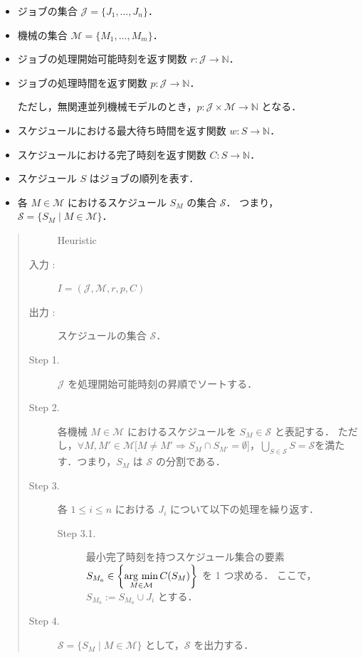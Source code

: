 \documentclass[12pt]{optlab-bachelor}
\newcommand{\argmin}{\mathop{\rm arg~min}\limits}
\begin{document}
\begin{itemize}
  \item ジョブの集合 $\mathcal{J} = \{J_1,\ldots,J_n\}$．
  \item 機械の集合 $\mathcal{M} = \{M_1,\ldots,M_m\}$．
  \item ジョブの処理開始可能時刻を返す関数 $r : \mathcal{J} \to \mathbb{N}$．
  \item ジョブの処理時間を返す関数 $p : \mathcal{J} \to \mathbb{N}$．

  ただし，無関連並列機械モデルのとき，$p : \mathcal{J} \times \mathcal{M} \to \mathbb{N}$ となる．
  \item スケジュールにおける最大待ち時間を返す関数 $w : S \to \mathbb{N}$．
  \item スケジュールにおける完了時刻を返す関数 $C : S \to \mathbb{N}$．
  \item スケジュール $S$ はジョブの順列を表す．
  \item 各 $M \in \mathcal{M}$ におけるスケジュール $S_M$ の集合 $\mathcal{S}$．
  つまり，$\mathcal{S} = \{S_M \mid M \in \mathcal{M}\}$．
\end{itemize}

\begin{quote}
  \begin{description}
    \item[] {\sc Heuristic}
    \item[入力 :] $I = (\mathcal{J}, \mathcal{M},r,p,C)$
    \item[出力 :] スケジュールの集合 $\mathcal{S}$．
  \end{description}
  \begin{description}
    \item[Step 1.]
    $\mathcal{J}$ を処理開始可能時刻の昇順でソートする．
    \item[Step 2.]
    各機械 $M \in \mathcal{M}$ におけるスケジュールを $S_M \in \mathcal{S}$ と表記する．
    ただし，$\forall M, M' \in \mathcal{M}\big[M \neq M' \Rightarrow S_M \cap S_{M'} = \emptyset \big]$，$\displaystyle \bigcup_{S \in \mathcal{S}}S = \mathcal{S}$を満たす．つまり，$S_M$ は $\mathcal{S}$ の分割である．
    \item[Step 3.]
    各 $1 \le i \le n$ における $J_i$ について以下の処理を繰り返す．
    \begin{description}
      \item[Step 3.1.]
      最小完了時刻を持つスケジュール集合の要素 $S_{M_a} \in {\displaystyle \left\{\argmin_{M \in \mathcal{M}}C(S_M)\right\}}$ を 1 つ求める．
      ここで，$S_{M_a} := S_{M_a} \cup J_i$ とする．
    \end{description}
    \item[Step 4.]
    $\mathcal{S} = \{ S_M \mid M \in \mathcal{M}\}$ として，$\mathcal{S}$ を出力する．
  \end{description}
\end{quote}
\end{document}
